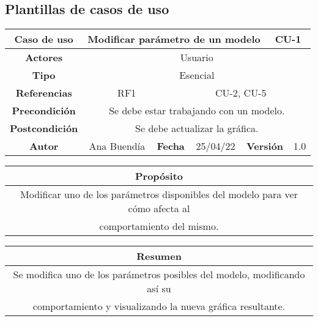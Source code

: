 \clearpage

\subsection{Plantillas de casos de uso}



\begin{table}[!h]
\begin{tabular}{|c|c|c|c|c|c|c|c|}
\hline
\rowcolor{cyan} \textbf{Caso de uso} & \multicolumn{5}{|c|}{Modificar parámetro de un modelo} & \multicolumn{2}{|c|}{CU-1} \\
\hline
\cellcolor{cyan} \textbf{Actores}              & \multicolumn{7}{|c|}{Usuario}           \\
\hline
\cellcolor{cyan} \textbf{Tipo}                 & \multicolumn{7}{|c|}{Esencial}             \\
\hline
\cellcolor{cyan} \textbf{Referencias}          & \multicolumn{2}{|c|}{RF1}           & \multicolumn{5}{|c|}{CU-2, CU-5}\\
\hline
\cellcolor{cyan} \textbf{Precondición}         & \multicolumn{7}{|c|}{Se debe estar trabajando con un modelo.}             \\
\hline
\cellcolor{cyan} \textbf{Postcondición}        & \multicolumn{7}{|c|}{Se debe actualizar la gráfica.}              \\
\hline
\cellcolor{cyan} \textbf{Autor}                &   Ana Buendía  & \multicolumn{2}{|c|}{\cellcolor{cyan} \textbf{Fecha}} &  25/04/22   & \multicolumn{2}{|c|}{\cellcolor{cyan} \textbf{Versión}} & 1.0  \\
\hline
\end{tabular}
\end{table}

\begin{table}[!h]
\begin{tabular}{|c|}
\hline
\cellcolor{cyan} \textbf{Propósito} \\
\hline
Modificar uno de los parámetros disponibles del modelo para ver cómo afecta al \\ comportamiento del mismo.   \\
\hline
\end{tabular}
\end{table}

\begin{table}[!h]
\begin{tabular}{|c|}
\hline
\cellcolor{cyan} \textbf{Resumen}  \\
\hline
Se modifica uno de los parámetros posibles del modelo, modificando así su \\ comportamiento y visualizando la nueva gráfica resultante.   \\
\hline
\end{tabular}
\end{table}

